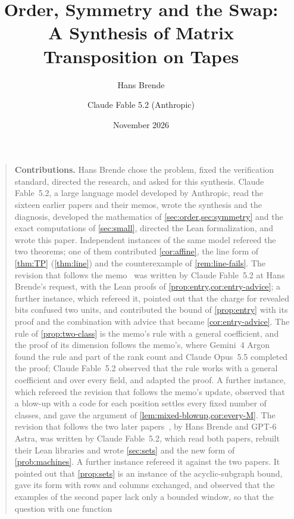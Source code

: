 \documentclass[11pt]{article}
\title{Order, Symmetry and the Swap:\\ A Synthesis of Matrix Transposition on Tapes}
\author{Hans Brende \and Claude Fable 5.2 (Anthropic)}
\date{November 2026}
\begin{document}
\maketitle

\begin{abstract}

\end{abstract}

\begin{quote}\small
\textbf{Contributions.} Hans Brende chose the problem, fixed the verification standard, directed the research, and asked for
this synthesis. Claude Fable~5.2, a large language model developed by Anthropic, read the sixteen earlier papers and their
memos, wrote the synthesis and the diagnosis, developed the mathematics of \cref{sec:order,sec:symmetry} and the exact
computations of \cref{sec:small}, directed the Lean formalization, and wrote this paper. Independent instances of the same
model refereed the two theorems; one of them contributed \cref{cor:affine}, the line form of \cref{thm:TP}
(\cref{thm:line}) and the counterexample of \cref{rem:line-fails}. The revision that follows the
memo~\cite{ClassUniformMemo2026} was written by Claude Fable~5.2 at Hans Brende's request, with the Lean proofs of
\cref{prop:entry,cor:entry-advice}; a further instance, which refereed it, pointed out that the charge for revealed
bits confused two units, and contributed the bound of \cref{prop:entry} with its proof and the combination with advice
that became \cref{cor:entry-advice}. The rule of \cref{prop:two-class} is the memo's rule with a general
coefficient, and the proof of its dimension follows the memo's, where Gemini~4 Argon found the rule and part of the
rank count and Claude Opus~5.5 completed the proof; Claude Fable~5.2 observed that the rule works with a general
coefficient and over every field, and adapted the proof. A further instance, which refereed the
revision that follows the memo's update, observed that a blow-up with a code for each position settles every fixed
number of classes, and gave the argument of \cref{lem:mixed-blowup,cor:every-M}. The revision that follows the two
later papers~\cite{AdaptiveTransfer2026,SharedDecoders2026}, by Hans Brende and GPT-6 Astra, was written by Claude
Fable~5.2, which read both papers, rebuilt their Lean libraries and wrote \cref{sec:sets} and the new form of
\cref{prob:machines}. A further instance refereed it against the two papers. It pointed out that
\cref{prop:sets} is an instance of the acyclic-subgraph bound, gave its form with rows and columns exchanged, and
observed that the examples of the second paper lack only a bounded window, so that the question with one function

\end{quote}
\end{document}
